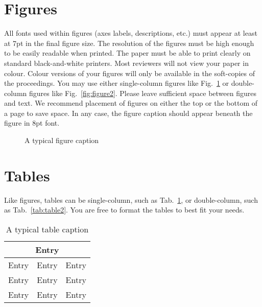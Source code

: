 \documentclass[a4paper, oneside, twocolumn, notitlepage, 10pt]{style/extarticle_ecoc2015}
\begin{document}
\section{Figures}

All fonts used within figures (axes labels, descriptions, etc.) must appear at least at 7pt in the final figure size. The resolution of the figures must be high enough to be easily readable when printed. The paper must be able to print clearly on standard black-and-white printers. Most reviewers will not view your paper in colour. Colour versions of your figures will only be available in the soft-copies of the proceedings.
You may use either single-column figures like Fig.~\ref{fig:figure1} or double-column figures like Fig.~\ref{fig:figure2}. Please leave sufficient space between figures and text. We recommend placement of figures on either the top or the bottom of a page to save space. In any case, the figure caption should appear beneath the figure in 8pt font.

\begin{figure}[tp]%
   \centering
    \caption{A typical figure caption}
    \label{fig:figure1}
\end{figure}


\section{Tables}

Like figures, tables can be single-column, such as
Tab.~\ref{tab:table1}, or double-column, such as
Tab.~\ref{tab:table2}. You are free to format the
tables to best fit your needs.

\begin{table}[htdp]
   \centering
\caption{A typical table caption} \label{tab:table1}
\begin{tabular}{|c|c|c|}
         \hline  \multicolumn{3}{|c|}{Entry}  \\
         \hline  Entry  & Entry & Entry\\
         \hline  Entry  & Entry & Entry\\
         \hline  Entry  & Entry & Entry\\
         \hline
\end{tabular}
\end{table}%
\end{document}
